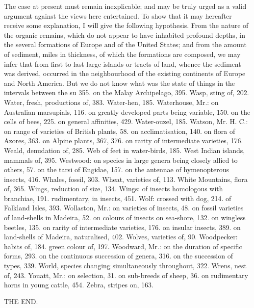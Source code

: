 The case at present must remain inexplicable; and may be truly urged as a valid argument against the views here entertained. To show that it may hereafter receive some explanation, I will give the following hypothesis. From the nature of the organic remains, which do not appear to have inhabited profound depths, in the several formations of Europe and of the United States; and from the amount of sediment, miles in thickness, of which the formations are composed, we may infer that from first to last large islands or tracts of land, whence the sediment was derived, occurred in the neighbourhood of the existing continents of Europe and North America. But we do not know what was the state of things in the intervals between the su
355. on the Malay Archipelago, 395.
Wasp, sting of, 202.
Water, fresh, productions of, 383.
Water-hen, 185.
Waterhouse, Mr.: on Australian marsupials, 116. on greatly developed parts being variable, 150. on the cells of bees, 225. on general affinities, 429.
Water-ouzel, 185.
Watson, Mr. H. C.: on range of varieties of British plants, 58. on acclimatisation, 140. on flora of Azores, 363. on Alpine plants, 367, 376. on rarity of intermediate varieties, 176.
Weald, denudation of, 285.
Web of feet in water-birds, 185.
West Indian islands, mammals of, 395.
Westwood: on species in large genera being closely allied to others, 57. on the tarsi of Engidae, 157. on the antennae of hymenopterous insects, 416.
Whales, fossil, 303.
Wheat, varieties of, 113.
White Mountains, flora of, 365.
Wings, reduction of size, 134.
Wings: of insects homologous with branchiae, 191. rudimentary, in insects, 451.
Wolf: crossed with dog, 214. of Falkland Isles, 393.
Wollaston, Mr.: on varieties of insects, 48. on fossil varieties of land-shells in Madeira, 52. on colours of insects on sea-shore, 132. on wingless beetles, 135. on rarity of intermediate varieties, 176. on insular insects, 389. on land-shells of Madeira, naturalised, 402.
Wolves, varieties of, 90.
Woodpecker: habits of, 184. green colour of, 197.
Woodward, Mr.: on the duration of specific forms, 293. on the continuous succession of genera, 316. on the succession of types, 339.
World, species changing simultaneously throughout, 322.
Wrens, nest of, 243.
Youatt, Mr.: on selection, 31. on sub-breeds of sheep, 36. on rudimentary horns in young cattle, 454.
Zebra, stripes on, 163.

THE END.